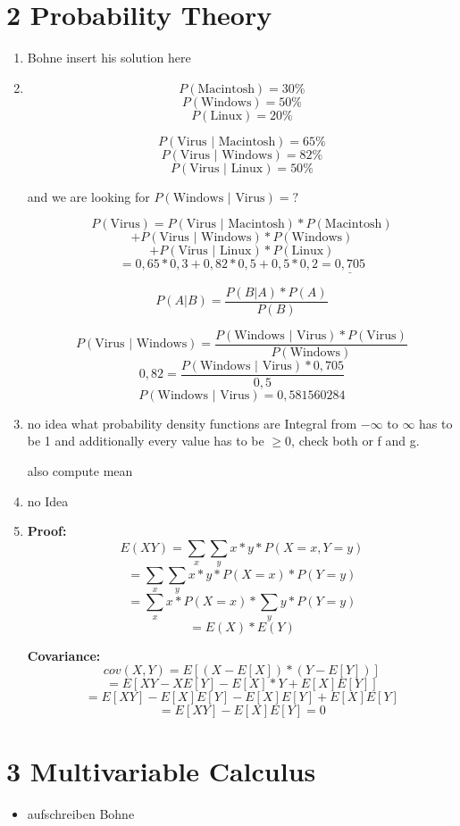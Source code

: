 \documentclass[12pt]{article}
\begin{document}
\newpage
\section*{2 Probability Theory}
\begin{enumerate}[1)]
    \item 
        Bohne insert his solution here
        
    \item
        $$ P(\text{Macintosh}) = 30\% $$
        $$ P(\text{Windows})= 50\% $$
        $$ P(\text{Linux})= 20\% $$

        $$ P( \text{Virus } \vert \text{ Macintosh}) = 65\% $$
        $$ P( \text{Virus } \vert \text{ Windows}) = 82\% $$
        $$ P( \text{Virus } \vert \text{ Linux}) = 50\% $$

        and we are looking for $P(\text{Windows } \vert \text{ Virus}) = \text{?}$

        $$ P( \text{Virus}) = P( \text{Virus } \vert \text{ Macintosh}) * P( \text{Macintosh}) $$
        $$+ P( \text{Virus } \vert \text{ Windows}) * P( \text{Windows}) $$
        $$+ P( \text{Virus } \vert \text{ Linux}) * P( \text{Linux}) $$
        $$ = 0,65*0,3 + 0,82*0,5 + 0,5 * 0,2 = \underline{0,705} $$

        $$ P(A \vert B) = \frac{P(B \vert A) * P(A)}{P(B)} $$

        $$ P( \text{Virus } \vert \text{ Windows}) = \frac{ P( \text{Windows } \vert \text{ Virus}) * P( \text{Virus})}{P( \text{Windows})} $$
        $$ 0,82 = \frac{ P( \text{Windows } \vert \text{ Virus}) * 0,705}{0,5}$$
        $$ P( \text{Windows } \vert \text{ Virus}) = 0,581560284 $$

    \item
        no idea what probability density functions are
        Integral from $- \infty$ to $\infty$ has to be 1 and additionally every value has to be $\geq 0$, check both or f and g.

        also compute mean

    \item
        no Idea

    \item
        \textbf{Proof:}\\
        $$ E( X Y ) = \sum_x \sum_y x * y * P(X=x, Y=y) $$
        $$ = \sum_x \sum_y x * y * P(X=x) * P(Y=y)$$
        $$ = \sum_x  x * P(X=x) * \sum_y y * P(Y=y)$$
        $$ = E(X) * E(Y)$$

        \textbf{Covariance:}\\
        $$ cov(X,Y) = E[(X - E[X]) * (Y - E[Y])] $$
        $$ = E[XY - X E[Y] - E[X]*Y + E[X]E[Y]]$$
        $$ = E[XY] - E[X]E[Y] - E[X]E[Y] + E[X]E[Y]$$
        $$ = E[XY] - E[X]E[Y] = 0$$

                
\end{enumerate}



\newpage
\section*{3 Multivariable Calculus}

\begin{itemize}
    \item 
        aufschreiben Bohne
\end{itemize}
\end{document}
